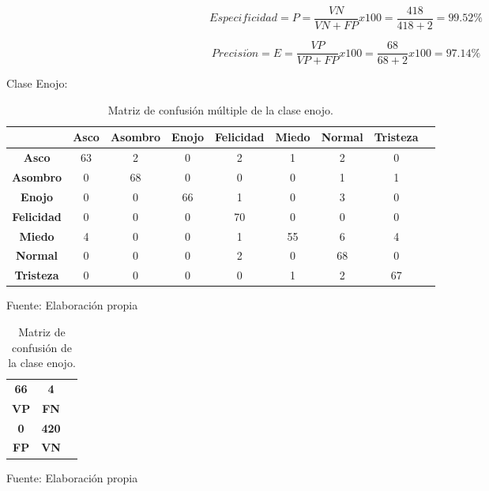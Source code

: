 \begin{equation}
Especificidad=P=\frac{VN}{VN+FP}x100=\frac{418}{418+2}=99.52\%
\end{equation}

\begin{equation}
Precisi\acute{o}n=E=\frac{VP}{VP+FP}x100=\frac{68}{68+2}x100=97.14\%
\end{equation}

\vskip 5cm

Clase Enojo:

\begin{table}[ht!]
\centering
\caption{Matriz de confusión múltiple de la clase enojo.} \vskip 0.1cm
\begin{tabular}{|c|c|c|c|c|c|c|c|c|} \hline
 & \bf Asco & \bf Asombro & \bf Enojo & \bf Felicidad & \bf Miedo & \bf Normal & \bf Tristeza \\ \hline
\bf Asco & 63 & 2 & 0 & 2 & 1 & 2 & 0 \\ \hline
\bf Asombro & 0 & 68 & 0 & 0 & 0 & 1 & 1 \\ \hline
\bf Enojo & 0 & 0 & 66 & 1 & 0 & 3 & 0 \\ \hline
\bf Felicidad & 0 & 0 & 0 & 70 & 0 & 0 & 0 \\ \hline
\bf Miedo & 4 & 0 & 0 & 1 & 55 & 6 & 4 \\ \hline
\bf Normal & 0 & 0 & 0 & 2 & 0 & 68 & 0 \\ \hline
\bf Tristeza & 0 & 0 & 0 & 0 & 1 & 2 & 67 \\ \hline

\end{tabular}
\begin{center}
{\small{Fuente: Elaboración propia}}
\end{center}
\end{table}

\begin{table}[ht!]
\centering
\caption{Matriz de confusión de la clase enojo.} \vskip 0.1cm
\begin{tabular}{|c|c|c|} \hline
\bf 66 \par & \bf 4 \par \\
\bf VP & \bf FN \\ \hline
\bf 0 \par & \bf 420 \par \\ 
\bf FP & \bf VN \\ \hline 
\end{tabular}
\begin{center}
{\small{Fuente: Elaboración propia}}
\end{center}
\end{table}


